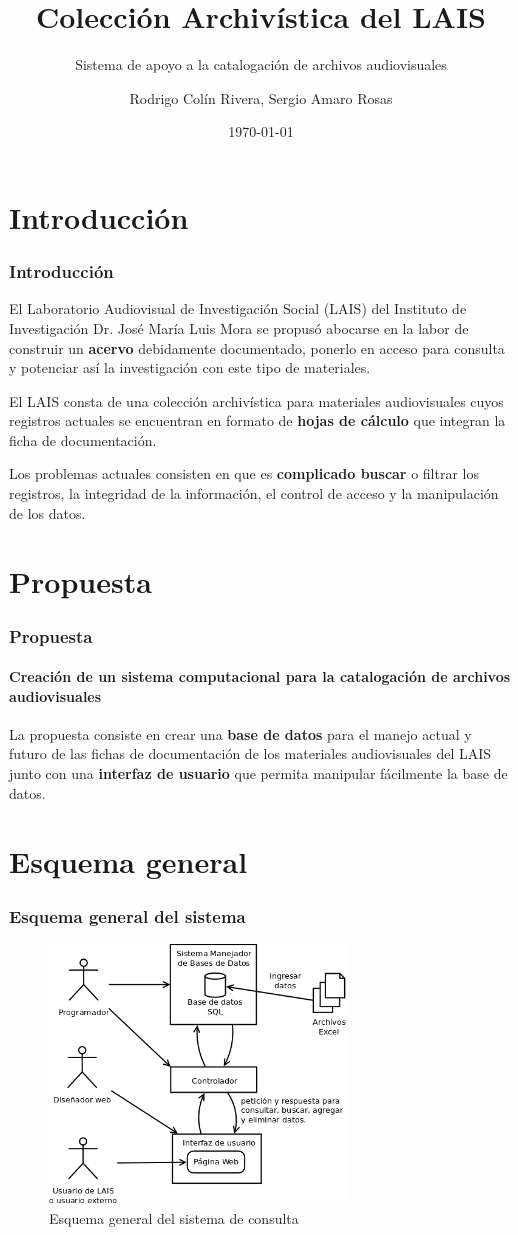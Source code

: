 \documentclass{beamer}
\title{Colección Archivística del LAIS}
\subtitle{Sistema de apoyo a la catalogación de archivos audiovisuales}
\author{Rodrigo Colín Rivera, Sergio Amaro Rosas}
\institute
{
  Laboratorio Audiovisual de Investigación Social\\
  Instituto de Investigaciones Dr. José María Luis Mora
}
\date{\today}
\begin{document}
\frame{\titlepage} %

\section{Introducción}
\begin{frame}
	\frametitle{Introducción}
	El Laboratorio Audiovisual de Investigación Social (LAIS) del Instituto de Investigación Dr. José María Luis Mora se propusó abocarse en la labor de construir un \textbf{acervo} debidamente documentado, ponerlo en acceso para consulta y potenciar así la investigación con este tipo de materiales.

	El LAIS consta de una colección archivística para materiales audiovisuales cuyos registros actuales se encuentran en formato de \textbf{hojas de cálculo} que integran la ficha de documentación.
	
	Los problemas actuales consisten en que es \textbf{complicado buscar} o filtrar los registros, la integridad de la información, el control de acceso y la manipulación de los datos.
\end{frame}

\section{Propuesta}
\begin{frame}
	\frametitle{Propuesta}
	\framesubtitle{Creación de un sistema computacional para la catalogación de archivos audiovisuales}
	
	La propuesta consiste en crear una \textbf{base de datos} para el manejo actual y futuro de las fichas de documentación de los materiales audiovisuales del LAIS junto con una \textbf{interfaz de usuario} que permita manipular fácilmente la base de datos.
\end{frame}

\section{Esquema general}
\begin{frame}
	\frametitle{Esquema general del sistema}
	\begin{figure}[H]
		\centering
		\includegraphics[width=0.7\textwidth]{EsquemaGeneral.png}
		\caption{Esquema general del sistema de consulta}
		\label{fig:esquema_general}
	\end{figure}
\end{frame}
\end{document}
